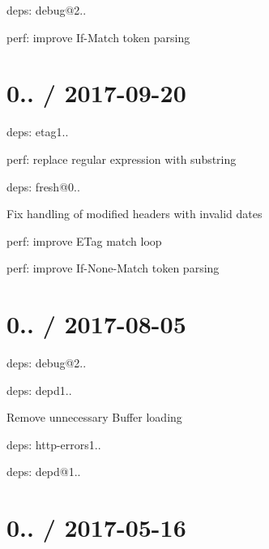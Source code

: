 \begin{DoxyItemize}
\item deps\+: debug@2..
\item perf\+: improve {\ttfamily If-\/\+Match} token parsing
\end{DoxyItemize}

\section*{0.. / 2017-\/09-\/20 }


\begin{DoxyItemize}
\item deps\+: etag1..
\begin{DoxyItemize}
\item perf\+: replace regular expression with substring
\end{DoxyItemize}
\item deps\+: fresh@0..
\begin{DoxyItemize}
\item Fix handling of modified headers with invalid dates
\item perf\+: improve E\+Tag match loop
\item perf\+: improve {\ttfamily If-\/\+None-\/\+Match} token parsing
\end{DoxyItemize}
\end{DoxyItemize}

\section*{0.. / 2017-\/08-\/05 }


\begin{DoxyItemize}
\item deps\+: debug@2..
\item deps\+: depd1..
\begin{DoxyItemize}
\item Remove unnecessary {\ttfamily Buffer} loading
\end{DoxyItemize}
\item deps\+: http-\/errors1..
\begin{DoxyItemize}
\item deps\+: depd@1..
\end{DoxyItemize}
\end{DoxyItemize}

\section*{0.. / 2017-\/05-\/16 }


